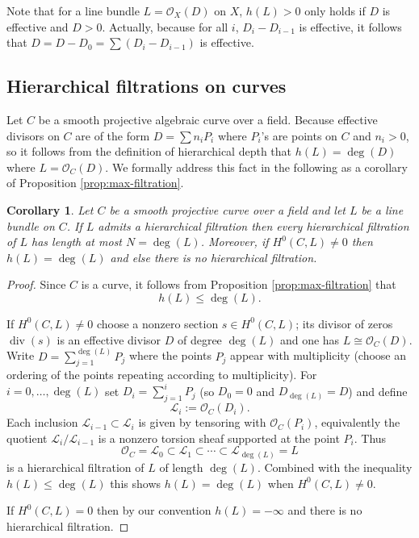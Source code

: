 \documentclass[14pt]{amsart}
\theoremstyle{plain}
\newtheorem{cor}[thm]{\bf Corollary}
\theoremstyle{definition}
\theoremstyle{remark}
\theoremstyle{example}
\def \L{\mathcal{L}}
\def \O{\mathcal{O}}
\begin{document}
Note that for a line bundle $L=\O_X(D)$ on $X$, $h(L)>0$ only holds if $D$ is effective and $D>0$. Actually, because for all $i$, $D_i-D_{i-1}$ is effective, it follows that $D=D-D_0=\sum(D_i-D_{i-1})$ is effective.

\subsection{Hierarchical filtrations on curves}

Let $C$ be a smooth projective algebraic curve over a field. Because effective divisors on $C$ are of the form $D=\sum n_iP_i$ where $P_i$'s are points on $C$ and $n_i>0$, so it follows from the definition of hierarchical depth that $h(L)=\deg(D)$ where $L=\O_C(D)$. We formally address this fact in the following as a corollary of Proposition \ref{prop:max-filtration}.

\begin{cor}\label{cor:curve-degree}
Let $C$ be a smooth projective curve over a field and let $L$ be a line bundle on $C$. If $L$ admits a hierarchical filtration then every hierarchical filtration of $L$ has length at most $N=\deg(L)$. Moreover, if
$H^0(C,L)\neq 0$ then $h(L)=\deg(L)$ and else there is no hierarchical filtration.
\end{cor}

\begin{proof}
Since $C$ is a curve, it follows from Proposition \ref{prop:max-filtration} that 
$$h(L)\leq \deg(L).$$

If $H^0(C,L)\neq0$ choose a nonzero section $s\in H^0(C,L)$; its divisor of zeros
$\operatorname{div}(s)$ is an effective divisor $D$ of degree $\deg(L)$ and one has
$L\cong\O_C(D)$. Write $D=\sum_{j=1}^{\deg(L)} P_j$ where the points $P_j$ appear
with multiplicity (choose an ordering of the points repeating according to multiplicity).
For $i=0,\dots,\deg(L)$ set $D_i=\sum_{j=1}^i P_j$ (so $D_0=0$ and $D_{\deg(L)}=D$)
and define
$$
\L_i := \O_C(D_i).
$$
Each inclusion $\L_{i-1}\subset\L_i$ is given by tensoring with $\O_C(P_i)$, equivalently
the quotient $\L_i/\L_{i-1}$ is a nonzero torsion sheaf supported at the point $P_i$.
Thus
$$
\O_C=\L_0\subset\L_1\subset\cdots\subset\L_{\deg(L)}=L
$$
is a hierarchical filtration of $L$ of length $\deg(L)$. Combined with the inequality
$h(L)\le\deg(L)$ this shows $h(L)=\deg(L)$ when $H^0(C,L)\neq0$.

If $H^0(C,L)=0$ then by our convention $h(L)=-\infty$ and there is no hierarchical filtration.
\end{proof}
\end{document}
